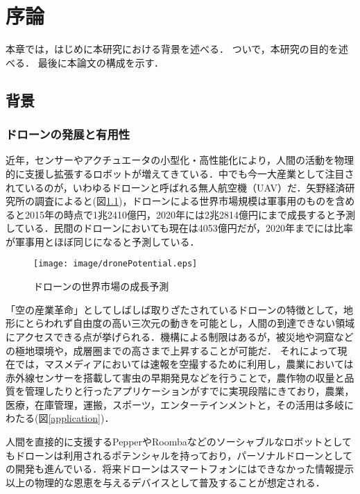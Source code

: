 \chapter{序論}
本章では，はじめに本研究における背景を述べる．
ついで，本研究の目的を述べる．
最後に本論文の構成を示す．

\section{背景}
\subsection{ドローンの発展と有用性}
近年，センサーやアクチュエータの小型化・高性能化により，人間の活動を物理的に支援し拡張するロボットが増えてきている．中でも今一大産業として注目されているのが，いわゆるドローンと呼ばれる無人航空機（UAV）だ．矢野経済研究所の調査によると(図\ref{dronePotential})，ドローンによる世界市場規模は軍事用のものを含めると2015年の時点で1兆2410億円，2020年には2兆2814億円にまで成長すると予測している\cite{Yano}．民間のドローンにおいても現在は4053億円だが，2020年までには比率が軍事用とほぼ同じになると予測している．

\begin{figure}[htbp]
 \begin{center}
  \texttt{[image: image/dronePotential.eps]}
 \end{center}
 \caption{ドローンの世界市場の成長予測\cite{dronePotential}}
 \label{dronePotential}
\end{figure} 

「空の産業革命」としてしばしば取りざたされているドローンの特徴として，地形にとらわれず自由度の高い三次元の動きを可能とし，人間の到達できない領域にアクセスできる点が挙げられる．機構による制限はあるが，被災地や洞窟などの極地環境や，成層圏までの高さまで上昇することが可能だ．
それによって現在では，マスメディアにおいては速報を空撮するために利用し，農業においては赤外線センサーを搭載して害虫の早期発見などを行うことで，農作物の収量と品質を管理したりと行ったアプリケーションがすでに実現段階にきており，農業，医療，在庫管理，運搬，スポーツ，エンターテインメントと，その活用は多岐にわたる(図\ref{application})．\cite{Augugliaro}\cite{Fleye}\cite{Fleye}\cite{Fleye}\cite{Fleye}\cite{Fleye}\cite{Fleye}

人間を直接的に支援するPepperやRoombaなどのソーシャブルなロボットとしてもドローンは利用されるポテンシャルを持っており，パーソナルドローンとしての開発も進んでいる\cite{Fleye}．将来ドローンはスマートフォンにはできなかった情報提示以上の物理的な恩恵を与えるデバイスとして普及することが想定される．

